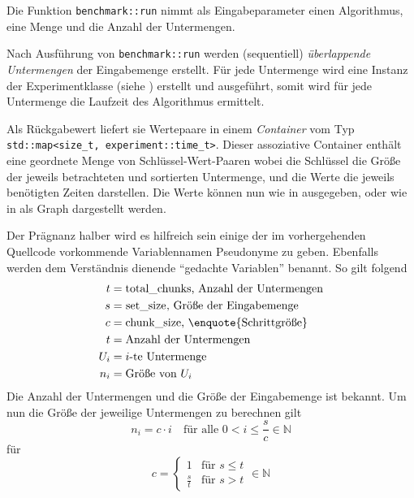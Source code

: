 Die Funktion \lstinline{benchmark::run} nimmt als Eingabeparameter einen Algorithmus, eine Menge und die Anzahl der Untermengen.

Nach Ausführung von \lstinline{benchmark::run} werden (sequentiell) \emph{überlappende Untermengen} der Eingabemenge erstellt. Für jede Untermenge wird eine Instanz der Experimentklasse (siehe ) erstellt und ausgeführt, somit wird für jede Untermenge die Laufzeit des Algorithmus ermittelt.

Als Rückgabewert liefert sie Wertepaare in einem \emph{Container} vom Typ \lstinline{std::map<size_t, experiment::time_t>}. Dieser assoziative Container enthält eine geordnete Menge von Schlüssel-Wert-Paaren wobei die Schlüssel die Größe der jeweils betrachteten und sortierten Untermenge, und die Werte die jeweils benötigten Zeiten darstellen. Die Werte können nun wie in  ausgegeben, oder wie in  als Graph dargestellt werden.



Der Prägnanz halber wird es hilfreich sein einige der im vorhergehenden Quellcode vorkommende Variablennamen Pseudonyme zu geben. Ebenfalls werden dem Verständnis dienende \enquote{gedachte Variablen} benannt. So gilt folgend
%
\begin{equation*}
	\begin{aligned}
		t &= \text{\lstinline{total_chunks}, Anzahl der Untermengen} \\
		s &= \text{\lstinline{set_size}, Größe der Eingabemenge} \\
		c &= \text{\lstinline{chunk_size}, \enquote{Schrittgröße}} \\
		t &= \text{Anzahl der Untermengen} \\
		U_i &= \text{$i$-te Untermenge} \\
		n_i &= \text{Größe von $U_i$} \\
	\end{aligned}
\end{equation*}
%
Die Anzahl der Untermengen und die Größe der Eingabemenge ist bekannt. Um nun die Größe der jeweilige Untermengen zu berechnen gilt
\begin{equation*}
	n_i = c \cdot i \quad \text{für alle $0 < i \leq \frac{s}{c} \in \mathbb{N}$}
\end{equation*}
für
\begin{equation*}
	c = \begin{cases}
		1 & \text{für $s \leq t$}\\
		\frac{s}{t} & \text{für $s > t$}
	\end{cases} \in \mathbb{N}
\end{equation*}

